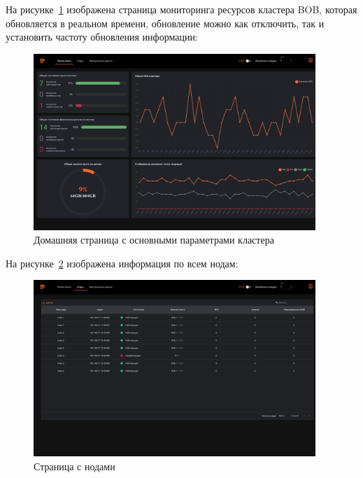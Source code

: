\clearpage

На рисунке~\ref{fig:panel1} изображена страница мониторинга ресурсов кластера BOB, которая обновляется в реальном времени, обновление можно как отключить, так и установить частоту обновления информации:

\begin{figure}[!htbp]
  \begin{center}
    \includegraphics[width=0.95\textwidth]{inc/panel1.png}
  \end{center}
  \caption{Домашняя страница с основными параметрами кластера}\label{fig:panel1}
\end{figure}

\clearpage

На рисунке~\ref{fig:panel2} изображена информация по всем нодам:

\begin{figure}[!htbp]
  \begin{center}
    \includegraphics[width=0.95\textwidth]{inc/panel2.png}
  \end{center}
  \caption{Страница с нодами}\label{fig:panel2}
\end{figure}

